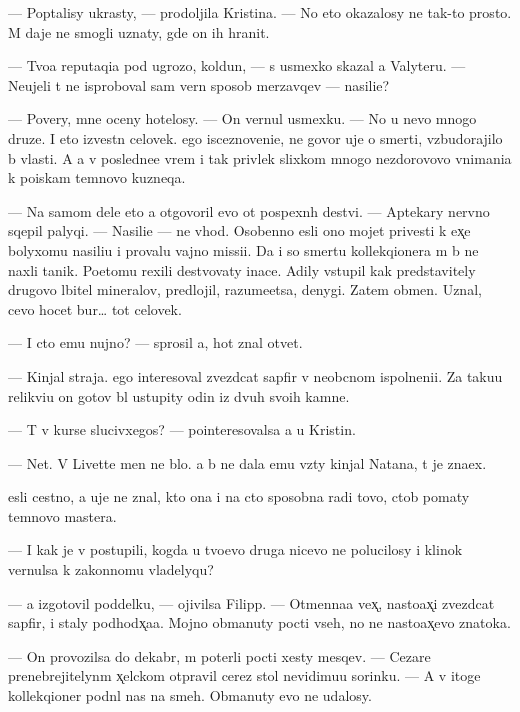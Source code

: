 \documentclass[10pt]{book}
\begin{document}
— Pop{\yi}talisy ukrasty, — prodoljila Kristina. — No eto okazalosy ne tak-to prosto. M{\yi} daje ne smogli uznaty, gde on ih hranit.

— Tvo{\y}a reputaqi{\y}a pod ugrozo{\y}, koldun, — s usmexko{\y} skazal {\y}a Valyteru. — Neujeli t{\yi} ne isproboval sam{\yi}{\y} vern{\yi}{\y} sposob merzavqev — nasili{\y}e?

— Povery, mne oceny hotelosy. — On vernul usmexku. — No u nevo mnogo druze{\y}. I eto izvestn{\yi}{\y} celovek. {\Y}ego isceznoveni{\y}e, ne govor{\ia} uje o smerti, vzbudorajilo b{\yi} vlasti. A {\y}a v posledne{\y}e vrem{\ia} i tak privlek slixkom mnogo nezdorovovo vnimani{\y}a k po{\y}iskam temnovo kuzneqa.

— Na samom dele eto {\y}a otgovoril {\y}evo ot pospexn{\yi}h de{\y}stvi{\y}. — Aptekary nervno sqepil palyqi. — Nasili{\y}e — ne v{\yi}hod. Osobenno {\y}esli ono mojet privesti k {\y}ex̨e bolyxomu nasili{\y}u i provalu vajno{\y} missi{\y}i. Da i so smert{\y}u kollekqionera m{\yi} b{\yi} ne naxli ta{\y}nik. Poetomu rexili de{\y}stvovaty inace. Adily v{\yi}stupil kak predstavitely drugovo l{\iu}bitel{\ia} mineralov, predlojil, razume{\y}etsa, denygi. Zatem obmen. Uznal, cevo hocet bur… tot celovek.

— I cto {\y}emu nujno? — sprosil {\y}a, hot{\ia} znal otvet.

— Kinjal straja. {\Y}ego interesoval zvezdcat{\yi}{\y} sapfir v neob{\yi}cnom ispolneni{\y}i. Za taku{\y}u relikvi{\y}u on gotov b{\yi}l ustupity odin iz dvuh svo{\y}ih kamne{\y}.

— T{\yi} v kurse slucivxegos{\ia}? — po{\y}interesovalsa {\y}a u Kristin{\yi}.

— Net. V Livette men{\ia} ne b{\yi}lo. {\Y}a b{\yi} ne dala {\y}emu vz{\ia}ty kinjal Natana, t{\yi} je zna{\y}ex.

{\Y}esli cestno, {\y}a uje ne znal, kto ona i na cto sposobna radi tovo, ctob{\yi} po{\y}maty temnovo mastera.

— I kak je v{\yi} postupili, kogda u tvo{\y}evo druga nicevo ne polucilosy i klinok vernulsa k zakonnomu vladelyqu?

— {\Y}a izgotovil poddelku, — ojivilsa Filipp. — Otmenna{\y}a vex̨, nasto{\y}ax̨i{\y} zvezdcat{\yi}{\y} sapfir, i staly podhod{\ia}x̨a{\y}a. Mojno obmanuty pocti vseh, no ne nasto{\y}ax̨evo znatoka.

— On provozilsa do dekabr{\ia}, m{\yi} poter{\ia}li pocti xesty mes{\ia}qev. — Cezare prenebrejitelyn{\yi}m x̨elckom otpravil cerez stol nevidimu{\y}u sorinku. — A v itoge kollekqioner podn{\ia}l nas na smeh. Obmanuty {\y}evo ne udalosy.
\end{document}

